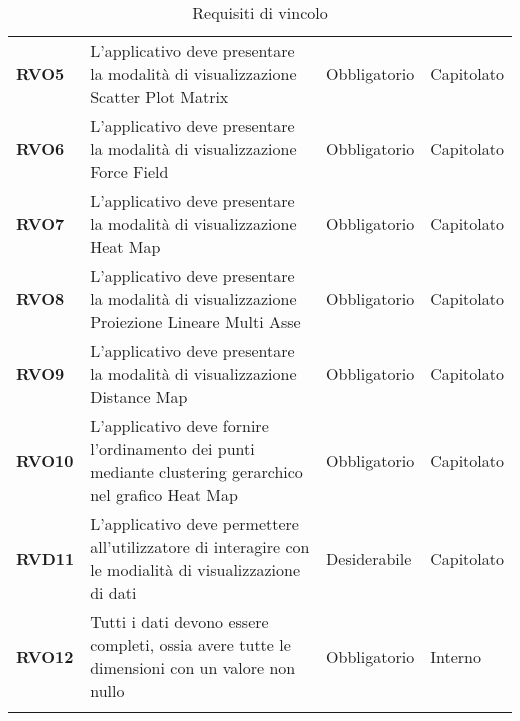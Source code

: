 \begin{longtable}[H]{| >{\raggedright\bfseries}m{20mm} | >{\raggedright}m{90mm} | >{\centering}m{25mm} | >{\centering\arraybackslash}m{30mm}|}
    RVO5
        & L'applicativo deve presentare la modalità di visualizzazione Scatter Plot Matrix
        & Obbligatorio
        & Capitolato \\

    RVO6
        & L'applicativo deve presentare la modalità di visualizzazione Force Field
        & Obbligatorio
        & Capitolato \\

    RVO7
        & L'applicativo deve presentare la modalità di visualizzazione Heat Map
        & Obbligatorio
        & Capitolato \\

    RVO8
        & L'applicativo deve presentare la modalità di visualizzazione Proiezione Lineare Multi Asse
        & Obbligatorio
        & Capitolato \\

    RVO9
        & L'applicativo deve presentare la modalità di visualizzazione Distance Map
        & Obbligatorio
        & Capitolato \\

    RVO10
        & L'applicativo deve fornire l'ordinamento dei punti mediante clustering gerarchico nel grafico Heat Map
        & Obbligatorio
        & Capitolato \\

    RVD11
        & L'applicativo deve permettere all'utilizzatore di interagire con le modialità di visualizzazione di dati
        & Desiderabile
        & Capitolato \\

    RVO12 &
        Tutti i dati devono essere completi, ossia avere tutte le dimensioni con un valore
        non nullo &
        Obbligatorio &
        Interno \\

    \hline
    \rowcolor{white}
    \caption{Requisiti di vincolo}%
    \label{tab:requisiti_di_vincolo}
\end{longtable}
